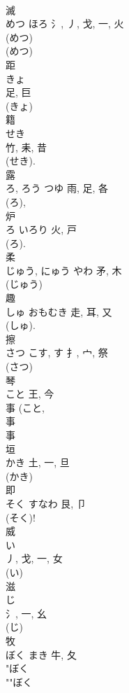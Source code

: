 \documentclass[8pt]{extreport}
\begin{document}
\begin{CJK}{UTF8}{min}
\\	滅	
\\	めつ	ほろ	氵, 丿, 戈, 一, 火	
\\	(めつ) 
\\	(めつ) 
\\	距	
\\	きょ	
\\	足, 巨	
\\	(きょ) 
\\	籍	
\\	せき	
\\	竹, 耒, 昔	
\\	(せき). 
\\	露	
\\	ろ, ろう	つゆ	雨, 足, 各	
\\	(ろ), 
\\	炉	
\\	ろ	いろり	火, 戸	
\\	(ろ).	
\\	柔	
\\	じゅう, にゅう	やわ	矛, 木	
\\	(じゅう) 
\\	趣	
\\	しゅ	おもむき	走, 耳, 又	
\\	(しゅ). 
\\	擦	
\\	さつ	こす, す	扌, 宀, 祭	
\\	(さつ) 
\\	琴	
\\	こと	王, 今	
\\	事 (こと, 
\\	事 
\\	事 
\\	垣	
\\	かき	土, 一, 旦	
\\	(かき) 
\\	即	
\\	そく	すなわ	艮, 卩	
\\	(そく)! 
\\	威	
\\	い	
\\	丿, 戈, 一, 女	
\\	(い) 
\\	滋	
\\	じ	
\\	氵, 一, 幺		
\\	(じ) 
\\	牧	
\\	ぼく	まき	牛, 夂	
\\	"ぼく 
\\	""ぼく 

\end{CJK}
\end{document}
